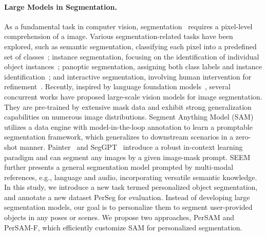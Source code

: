 \documentclass{article} \usepackage{iclr2024_conference,times}
\begin{document}
\paragraph{Large Models in Segmentation.} 
As a fundamental task in computer vision, segmentation~\citep{long2015fully, jiang2022prototypical, zhao2017pyramid, xu2021learning, jiang2023stc,lin2022frozen} requires a pixel-level comprehension of a image. Various segmentation-related tasks have been explored, such as semantic segmentation, classifying each pixel into a predefined set of classes~\citep{badrinarayanan2017segnet, chen2017deeplab, zheng2021rethinking, cheng2022masked, xie2021segformer, song2020rethinking}; instance segmentation, focusing on the identification of individual object instances~\citep{he2017mask,wang2020solov2,tian2020conditional}; panoptic segmentation, assigning both class labels and instance identification~\citep{kirillov2019panoptic,li2019attention}; and interactive segmentation, involving human intervention for refinement~\citep{hao2021edgeflow, chen2021conditional}.
Recently, inspired by language foundation models~\citep{zhang2023llama,brown2020language}, several concurrent works have proposed large-scale vision models for image segmentation. They are pre-trained by extensive mask data and exhibit strong generalization capabilities on numerous image distributions.
Segment Anything Model (SAM)~\citep{kirillov2023segment} utilizes a data engine with model-in-the-loop annotation to learn a promptable segmentation framework, which generalizes to downstream scenarios in a zero-shot manner.
Painter~\citep{wang2022images} and SegGPT~\citep{wang2023seggpt} introduce a robust in-context learning paradigm and can segment any images by a given image-mask prompt.
SEEM~\citep{zou2023segment} further presents a general segmentation model prompted by multi-modal references, e.g., language and audio, incorporating versatile semantic knowledge.
In this study, we introduce a new task termed personalized object segmentation, and annotate a new dataset PerSeg for evaluation.
Instead of developing large segmentation models, our goal is to personalize them to segment user-provided objects in any poses or scenes. 
We propose two approaches, PerSAM and PerSAM-F, which efficiently customize SAM for personalized segmentation.
\end{document}
